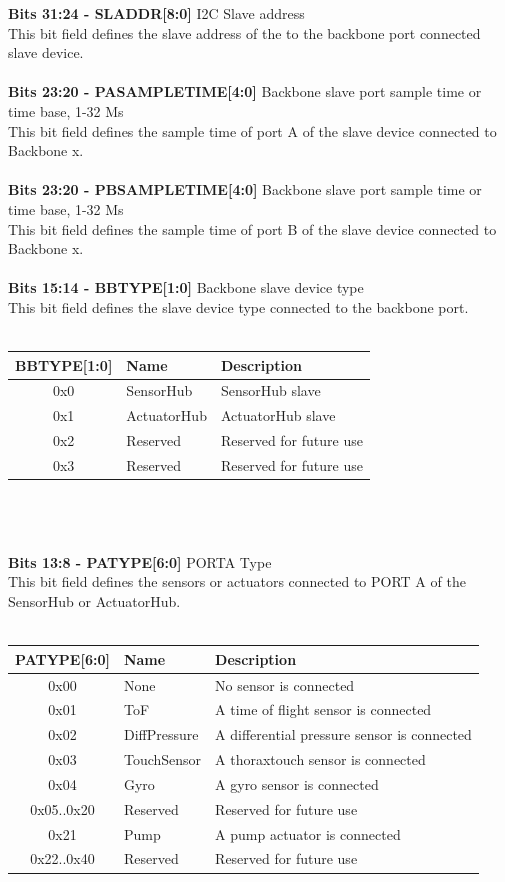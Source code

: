 \textbf{Bits 31:24 - SLADDR[8:0]} I2C Slave address\\
This bit field defines the slave address of the to the backbone port connected slave device.\\\\
\textbf{Bits 23:20 - PASAMPLETIME[4:0]} Backbone slave port sample time or time base, 1-32 Ms\\
This bit field defines the sample time of port A of the slave device connected to Backbone x.\\\\
\textbf{Bits 23:20 - PBSAMPLETIME[4:0]} Backbone slave port sample time or time base, 1-32 Ms\\
This bit field defines the sample time of port B of the slave device connected to Backbone x.\\\\
\textbf{Bits 15:14 - BBTYPE[1:0]} Backbone slave device type\\
This bit field defines the slave device type connected to the backbone port.\\\\
\begin{tabular}{|c|l|l|}
\hline
   BBTYPE[1:0]  &  Name & Description\\ \hline
    0x0 &  SensorHub & SensorHub slave\\ \hline
    0x1 & ActuatorHub & ActuatorHub slave\\ \hline
    0x2 & Reserved & Reserved for future use\\ \hline
    0x3 & Reserved & Reserved for future use\\
\hline
\end{tabular}\\\\\\
\textbf{Bits 13:8 - PATYPE[6:0]} PORTA Type\\
This bit field defines the sensors or actuators connected to PORT A of the SensorHub or
ActuatorHub.\\\\
\begin{tabular}{|c|l|l|}
    \hline
    PATYPE[6:0] & Name & Description \\ \hline
    0x00 & None & No sensor is connected\\ \hline
    0x01 & ToF & A time of flight sensor is connected\\ \hline
    0x02 & DiffPressure & A differential pressure sensor is connected\\ \hline
    0x03 & TouchSensor & A thoraxtouch sensor is connected\\ \hline
    0x04 & Gyro & A gyro sensor is connected\\ \hline
    0x05..0x20 & Reserved & Reserved for future use\\ \hline
    0x21 & Pump & A pump actuator is connected\\ \hline
    0x22..0x40 & Reserved & Reserved for future use \\ \hline
\end{tabular}
